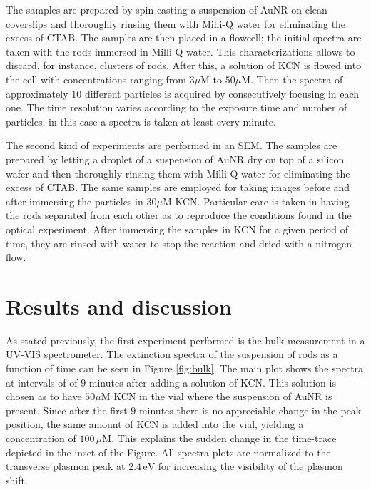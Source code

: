 \documentclass[twocolumn]{article}
\begin{document}
The samples are prepared by spin casting a suspension of AuNR on clean
coverslips and thoroughly rinsing them  with Milli-Q water for eliminating the
excess of CTAB. The samples are then placed in a flowcell; the initial spectra
are taken with the rods immersed in Milli-Q water. This characterizations allows
to discard, for instance, clusters of rods. After this, a solution of KCN is
flowed into the cell with concentrations ranging from $3\mu\textrm{M}$ to
$50\mu\textrm{M}$. Then the spectra of approximately $10$ different particles is
acquired by consecutively focusing in each one. The time resolution varies
according to the exposure time and number of particles; in this case a spectra
is taken at least every minute.

The second kind of experiments are performed in an SEM. The samples are prepared
by letting a droplet of a suspension of AuNR dry on top of a silicon wafer and
then thoroughly rinsing them with Milli-Q water for eliminating the excess of
CTAB. The same samples are employed for taking images before and after immersing
the particles in $30\mu\textrm{M}$ KCN. Particular care is taken in having the
rods separated from each other as to reproduce the conditions found in the optical
experiment. After immersing the samples in KCN for a given period of time, they
are rinsed with water to stop the reaction and dried with a nitrogen flow.

\section{Results and discussion}

As stated previously, the first experiment performed is the bulk measurement in
a UV-VIS spectrometer. The extinction spectra of the suspension of rods as a
function of time can be seen in Figure \ref{fig:bulk}. The main plot shows the
spectra at intervals of of $9$ minutes after adding a solution of KCN. This
solution is chosen as to have $50\mu\textrm{M}$ KCN in the vial where the
suspension of AuNR is present. Since after the first $9$ minutes there is no appreciable
change in the peak position, the same amount of KCN is added into the vial,
yielding a concentration of $100\,\mu\textrm{M}$. This explains the sudden
change in the time-trace depicted in the inset of the Figure. All spectra plots are
normalized to the transverse plasmon peak at $2.4\,\textrm{eV}$ for increasing
the visibility of the plasmon shift.
\end{document}
